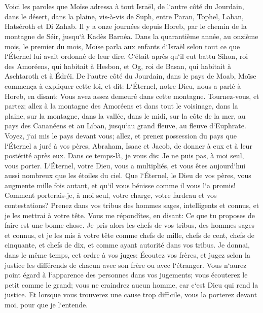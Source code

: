 

\chapter{}

\verse Voici les paroles que Moïse adressa à tout Israël, de l`autre côté du Jourdain, dans le désert, dans la plaine, vis-à-vis de Suph, entre Paran, Tophel, Laban, Hatséroth et Di Zahab. 
\verse Il y a onze journées depuis Horeb, par le chemin de la montagne de Séir, jusqu`à Kadès Barnéa. 
\verse Dans la quarantième année, au onzième mois, le premier du mois, Moïse parla aux enfants d`Israël selon tout ce que l`Éternel lui avait ordonné de leur dire. 
\verse C`était après qu`il eut battu Sihon, roi des Amoréens, qui habitait à Hesbon, et Og, roi de Basan, qui habitait à Aschtaroth et à Édréi. 
\verse De l`autre côté du Jourdain, dans le pays de Moab, Moïse commença à expliquer cette loi, et dit: 
\verse L`Éternel, notre Dieu, nous a parlé à Horeb, en disant: Vous avez assez demeuré dans cette montagne. 
\verse Tournez-vous, et partez; allez à la montagne des Amoréens et dans tout le voisinage, dans la plaine, sur la montagne, dans la vallée, dans le midi, sur la côte de la mer, au pays des Cananéens et au Liban, jusqu`au grand fleuve, au fleuve d`Euphrate. 
\verse Voyez, j`ai mis le pays devant vous; allez, et prenez possession du pays que l`Éternel a juré à vos pères, Abraham, Isaac et Jacob, de donner à eux et à leur postérité après eux. 
\verse Dans ce temps-là, je vous dis: Je ne puis pas, à moi seul, vous porter. 
\verse L`Éternel, votre Dieu, vous a multipliés, et vous êtes aujourd`hui aussi nombreux que les étoiles du ciel. 
\verse Que l`Éternel, le Dieu de vos pères, vous augmente mille fois autant, et qu`il vous bénisse comme il vous l`a promis! 
\verse Comment porterais-je, à moi seul, votre charge, votre fardeau et vos contestations? 
\verse Prenez dans vos tribus des hommes sages, intelligents et connus, et je les mettrai à votre tête. 
\verse Vous me répondîtes, en disant: Ce que tu proposes de faire est une bonne chose. 
\verse Je pris alors les chefs de vos tribus, des hommes sages et connus, et je les mis à votre tête comme chefs de mille, chefs de cent, chefs de cinquante, et chefs de dix, et comme ayant autorité dans vos tribus. 
\verse Je donnai, dans le même temps, cet ordre à vos juges: Écoutez vos frères, et jugez selon la justice les différends de chacun avec son frère ou avec l`étranger. 
\verse Vous n`aurez point égard à l`apparence des personnes dans vos jugements; vous écouterez le petit comme le grand; vous ne craindrez aucun homme, car c`est Dieu qui rend la justice. Et lorsque vous trouverez une cause trop difficile, vous la porterez devant moi, pour que je l`entende. 
